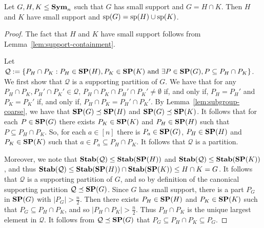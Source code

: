 \documentclass[../paper.tex]{subfiles}
\begin{document}
\begin{lem}
  Let $G, H, K \leq \text{\textbf{Sym}}_n$ such that $G$ has small support and $G = H \cap K$.
  Then $H$ and $K$ have small support and $\text{sp}(G) = \text{sp}(H) \cup
  \text{sp}(K)$.
  \label{lem:row-column-supports-well-behaved}
\end{lem}
\begin{proof}
  The fact that $H$ and $K$ have small support follows from
  Lemma~\ref{lem:support-containment}.

  Let $\mathcal{Q} := \{P_H \cap P_K : P_H \in \text{\textbf{SP}}(H), P_K \in \text{\textbf{SP}}(K) \text{ and
  } \exists P \in \text{\textbf{SP}}(G), P \subseteq P_H \cap P_K \} $. We first show that
  $\mathcal{Q}$ is a supporting partition of $G$. We have that for any $P_H \cap
  P_K, P_H' \cap P_K' \in \mathcal{Q}$, $P_H \cap P_K \cap P_H' \cap P_K' \neq
  \emptyset$ if, and only if, $P_H = P_H'$ and $P_K = P_K'$ if, and only if,
  $P_H \cap P_K = P_H' \cap P_K'$. By Lemma~\ref{lem:subgroup-coarse}, we have
  that $\text{\textbf{SP}}(G) \preceq \text{\textbf{SP}}(H)$ and $\text{\textbf{SP}}(G) \preceq \text{\textbf{SP}}(K)$. It follows that for
  each $P \in \text{\textbf{SP}}(G)$ there exists $P_K \in \text{\textbf{SP}}(K)$ and $P_H \in \text{\textbf{SP}}(H)$ such
  that $P \subseteq P_H \cap P_K$. So, for each $a \in [n]$ there is $P_a \in
  \text{\textbf{SP}}(G)$, $P_H \in \text{\textbf{SP}}(H)$ and $P_K \in \text{\textbf{SP}}(K)$ such that $a \in P_a \subseteq
  P_H \cap P_K$. It follows that $\mathcal{Q}$ is a partition.

  Moreover, we note that $\text{\textbf{Stab}}(\mathcal{Q}) \leq \text{\textbf{Stab}}(\text{\textbf{SP}}(H))$ and
  $\text{\textbf{Stab}}(\mathcal{Q}) \leq \text{\textbf{Stab}}(\text{\textbf{SP}}(K))$, and thus $\text{\textbf{Stab}}(\mathcal{Q}) \leq
  \text{\textbf{Stab}}(\text{\textbf{SP}}(H)) \cap \text{\textbf{Stab}}(\text{\textbf{SP}}(K)) \leq H \cap K = G$. It follows that
  $\mathcal{Q}$ is a supporting partition of $G$, and so by definition of the
  canonical supporting partition $\mathcal{Q} \preceq \text{\textbf{SP}} (G)$. Since $G$ has
  small support, there is a part $P_G$ in $\text{\textbf{SP}}(G)$ with $|P_G| > \frac{n}{2}$.
  Then there exists $P_H \in \text{\textbf{SP}}(H)$ and $P_K \in \text{\textbf{SP}}(K)$ such that $P_G
  \subseteq P_H \cap P_K$, and so $\vert P_H \cap P_K \vert > \frac{n}{2}$. Thus
  $P_H \cap P_K$ is the unique largest element in $\mathcal{Q}$. It follows from
  $\mathcal{Q} \preceq \text{\textbf{SP}}(G)$ that $P_G \subseteq P_H \cap P_K \subseteq P_G$.



\end{proof}
\end{document}
